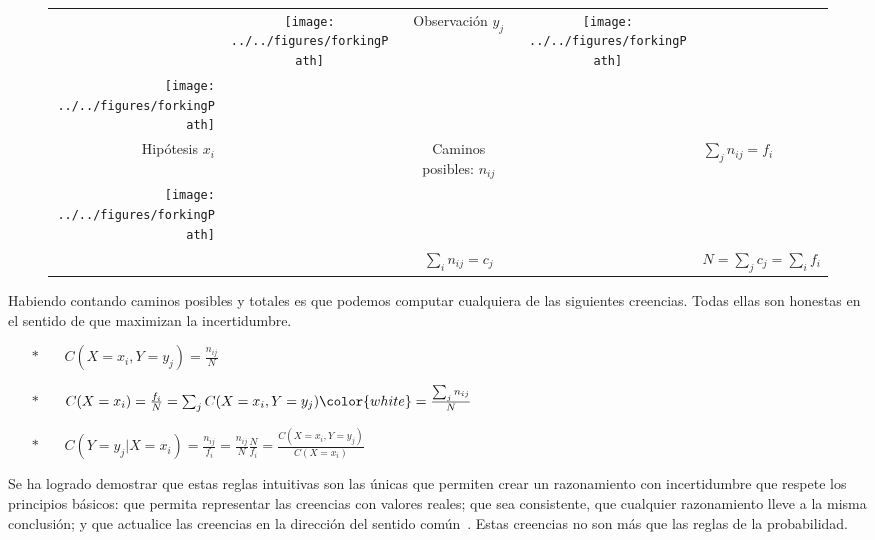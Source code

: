 \documentclass[a4paper,10pt]{article}
\begin{document}
\begin{figure}[H]     
    \centering \small
  \begin{tabular}{ccccl}
                      &  \texttt{[image: ../../figures/forkingPath]}                 & Observaci\'on $y_j$            &       \texttt{[image: ../../figures/forkingPath]}                  &  \\[0.1cm] \cline{2-4}
\multicolumn{1}{r|}{\texttt{[image: ../../figures/forkingPath]}} & \multicolumn{1}{c|}{\textcolor{white}{$n_{ij}$}} & \multicolumn{1}{r|}{} & \multicolumn{1}{l|}{} &  \\[0.1cm] \cline{2-4}
\multicolumn{1}{r|}{Hip\'otesis $x_i$} & \multicolumn{1}{l|}{} & \multicolumn{1}{c|}{\scriptsize Caminos posibles: \small $n_{ij}$} & \multicolumn{1}{l|}{} &  $\sum_j n_{ij} = {f_i}$ \\[0.1cm] \cline{2-4}
\multicolumn{1}{r|}{\texttt{[image: ../../figures/forkingPath]}} & \multicolumn{1}{l|}{} & \multicolumn{1}{l|}{} & \multicolumn{1}{r|}{\textcolor{white}{$n_{ij}$}} &  \\[0.1cm] \cline{2-4}
&  & $\sum_i n_{ij} = {c_j}$ & & $N = \sum_j c_j = \sum_i f_i$
\end{tabular}

\end{figure}

 Habiendo contando caminos posibles y totales es que podemos computar cualquiera de las siguientes creencias.
 Todas ellas son honestas en el sentido de que maximizan la incertidumbre.

\begin{itemize} \setlength\itemsep{0.1cm}
 \item[$\ast$]  \ \ \  $C(X = x_i, Y= y_j) = \frac{n_{ij}}{N}$
 \item[$\ast$]  \ \ \ $C(X = x_i) =  \frac{f_i}{N} = \sum_j C(X=x_i, Y= y_j) \color{white} = \frac{\sum_j n_{ij}}{N}$
 \item[$\ast$]  \ \ \  $C(Y= y_j|X=x_i) = \frac{n_{ij}}{f_i} = \frac{n_{ij}}{N} \frac{N}{f_i} = \frac{C(X = x_i , Y = y_j)}{C(X = x_i)}$
\end{itemize}

Se ha logrado demostrar que estas reglas intuitivas son las \'unicas que permiten crear un razonamiento con incertidumbre que respete los principios b\'asicos: que permita representar las creencias con valores reales; que sea consistente, que cualquier razonamiento lleve a la misma conclusión; y que actualice las creencias en la direcci\'on del sentido com\'un~\cite{cox1946-reasonableExpectation}.
Estas creencias no son m\'as que las reglas de la probabilidad.
\end{document}
